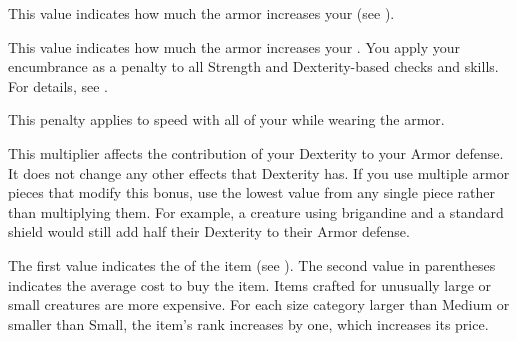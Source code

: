      This value indicates how much the armor increases your  (see ).

     This value indicates how much the armor increases your .
    You apply your encumbrance as a penalty to all Strength and Dexterity-based checks and skills.
    For details, see .

     This penalty applies to speed with all of your  while wearing the armor.

     This multiplier affects the contribution of your Dexterity to your Armor defense.
    It does not change any other effects that Dexterity has.
    If you use multiple armor pieces that modify this bonus, use the lowest value from any single piece rather than multiplying them.
    For example, a creature using brigandine and a standard shield would still add half their Dexterity to their Armor defense.

     The first value indicates the  of the item (see ).
    The second value in parentheses indicates the average cost to buy the item.
    Items crafted for unusually large or small creatures are more expensive.
    For each size category larger than Medium or smaller than Small, the item's rank increases by one, which increases its price.

